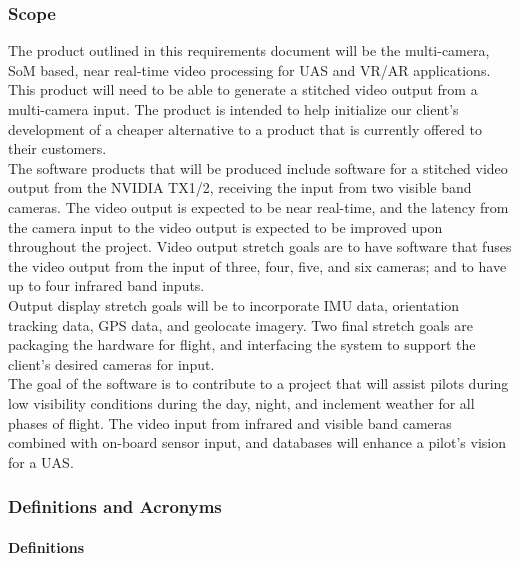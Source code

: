 \documentclass[letterpaper,10pt,serif,draftclsnofoot,onecolumn,compsoc,titlepage]{IEEEtran}
\begin{document}
\subsubsection{Scope}

The product outlined in this requirements document will be the multi-camera, SoM based,
 near real-time video processing for UAS and VR/AR applications. This product will need to 
 be able to generate a stitched video output from a multi-camera input. The product is 
 intended to help initialize our client's development of a cheaper alternative to a 
 product that is currently offered to their customers.\\

The software products that will be produced include software for a stitched video output 
from the NVIDIA TX1/2, receiving the input from two visible band cameras. 
The video output is expected to be near real-time, and the latency from the camera 
input to the video output is expected to be improved upon throughout the project. Video 
output stretch goals are to have software that fuses the video output from the input of 
three, four, five, and six cameras; and to have up to four infrared band inputs.\\

Output display stretch goals will be to incorporate IMU data, orientation tracking 
data, GPS data, and geolocate imagery. Two final stretch goals are packaging the 
hardware for flight, and interfacing the system to support the client's desired 
cameras for input.\\

The goal of the software is to contribute to a project that will assist pilots during 
low visibility conditions during the day, night, and inclement weather for all phases 
of flight. The video input from infrared and visible band cameras combined with 
on-board sensor input, and databases will enhance a pilot's vision for a UAS.\\

\subsubsection{Definitions and Acronyms}

\paragraph{Definitions}
\end{document}
